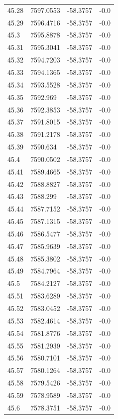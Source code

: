 \begin{table}[H]
\begin{tabular}{llll}
45.28 & 7597.0553 & -58.3757 & -0.0 \\
45.29 & 7596.4716 & -58.3757 & -0.0 \\
45.3 & 7595.8878 & -58.3757 & -0.0 \\
45.31 & 7595.3041 & -58.3757 & -0.0 \\
45.32 & 7594.7203 & -58.3757 & -0.0 \\
45.33 & 7594.1365 & -58.3757 & -0.0 \\
45.34 & 7593.5528 & -58.3757 & -0.0 \\
45.35 & 7592.969 & -58.3757 & -0.0 \\
45.36 & 7592.3853 & -58.3757 & -0.0 \\
45.37 & 7591.8015 & -58.3757 & -0.0 \\
45.38 & 7591.2178 & -58.3757 & -0.0 \\
45.39 & 7590.634 & -58.3757 & -0.0 \\
45.4 & 7590.0502 & -58.3757 & -0.0 \\
45.41 & 7589.4665 & -58.3757 & -0.0 \\
45.42 & 7588.8827 & -58.3757 & -0.0 \\
45.43 & 7588.299 & -58.3757 & -0.0 \\
45.44 & 7587.7152 & -58.3757 & -0.0 \\
45.45 & 7587.1315 & -58.3757 & -0.0 \\
45.46 & 7586.5477 & -58.3757 & -0.0 \\
45.47 & 7585.9639 & -58.3757 & -0.0 \\
45.48 & 7585.3802 & -58.3757 & -0.0 \\
45.49 & 7584.7964 & -58.3757 & -0.0 \\
45.5 & 7584.2127 & -58.3757 & -0.0 \\
45.51 & 7583.6289 & -58.3757 & -0.0 \\
45.52 & 7583.0452 & -58.3757 & -0.0 \\
45.53 & 7582.4614 & -58.3757 & -0.0 \\
45.54 & 7581.8776 & -58.3757 & -0.0 \\
45.55 & 7581.2939 & -58.3757 & -0.0 \\
45.56 & 7580.7101 & -58.3757 & -0.0 \\
45.57 & 7580.1264 & -58.3757 & -0.0 \\
45.58 & 7579.5426 & -58.3757 & -0.0 \\
45.59 & 7578.9589 & -58.3757 & -0.0 \\
45.6 & 7578.3751 & -58.3757 & -0.0 \\

\end{tabular}
\end{table}
